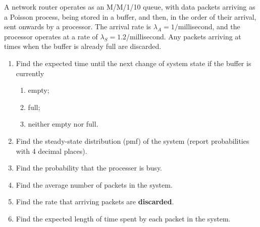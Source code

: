   \item A network router operates as an M/M/1/10 queue, with data packets arriving as
    a Poisson process, being stored in a buffer, and then, in the order of their arrival, sent onwards
    by a processor. The arrival rate is $\lambda_A= 1/$millisecond, and the processor operates at a rate of
    $\lambda_S = 1.2$/millisecond. Any packets arriving at times when the buffer is already full are discarded.
    \begin{enumerate}
      \item Find the expected time until the next change of system state if the buffer is currently
        \begin{enumerate}
          \item empty;
          \item full;
          \item neither empty nor full.
        \end{enumerate}
      \item Find the steady-state distribution (pmf) of the system
        (report probabilities with 4 decimal places).
      \item Find the probability that the processer is busy.
      \item Find the average number of packets in the system.
      \item Find the rate that arriving packets are {\bf discarded}. 
      \item Find the expected length of time spent by each packet in the system.
    \end{enumerate}
